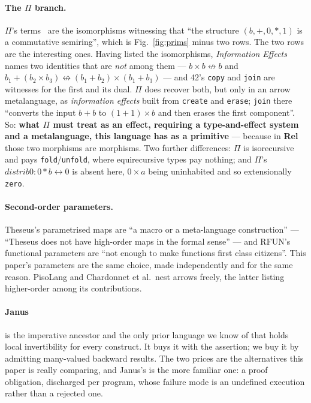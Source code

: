 \documentclass[runningheads,envcountsame]{llncs}
\newcommand{\iso}{\leftrightarrow}
\newcommand{\Rel}{\textbf{Rel}}
\begin{document}
\paragraph{The $\Pi$ branch.} $\Pi$'s terms~\cite{pi} are the isomorphisms
witnessing that ``the structure $(b,+,0,*,1)$ is a commutative semiring'', which is
Fig.~\ref{fig:prims} minus two rows. The two rows are the interesting ones. Having
listed the isomorphisms, \emph{Information Effects} names two identities that are
\emph{not} among them --- $b \times b \not\iso b$ and
$b_1 + (b_2 \times b_3) \not\iso (b_1+b_2) \times (b_1+b_3)$ --- and 42's
\texttt{copy} and \texttt{join} are witnesses for the first and its dual. $\Pi$
does recover both, but only in an arrow metalanguage, as \emph{information effects}
built from \texttt{create} and \texttt{erase}; \texttt{join} there ``converts the
input $b+b$ to $(1+1) \times b$ and then erases the first component''. So:
\textbf{what $\Pi$ must treat as an effect, requiring a type-and-effect system and
a metalanguage, this language has as a primitive} --- because in \Rel{} those two
morphisms are morphisms. Two further differences: $\Pi$ is isorecursive and pays
\texttt{fold}/\texttt{unfold}, where equirecursive types pay nothing; and $\Pi$'s
$\mathit{distrib0} : 0 * b \iso 0$ is absent here, $0 \times a$ being uninhabited
and so extensionally \texttt{zero}.

\paragraph{Second-order parameters.} Theseus's parametrised maps are ``a macro or a
meta-language construction'' --- ``Theseus does not have high-order maps in the
formal sense'' --- and RFUN's functional parameters are ``not enough to make
functions first class citizens''. This paper's parameters are the same choice, made
independently and for the same reason. PisoLang and Chardonnet et al.\ nest arrows
freely, the latter listing higher-order among its contributions.

\paragraph{Janus} is the imperative ancestor and the only prior language we know of
that holds local invertibility for every construct. It buys it with the assertion;
we buy it by admitting many-valued backward results. The two prices are the
alternatives this paper is really comparing, and Janus's is the more familiar one:
a proof obligation, discharged per program, whose failure mode is an undefined
execution rather than a rejected one.
\end{document}
